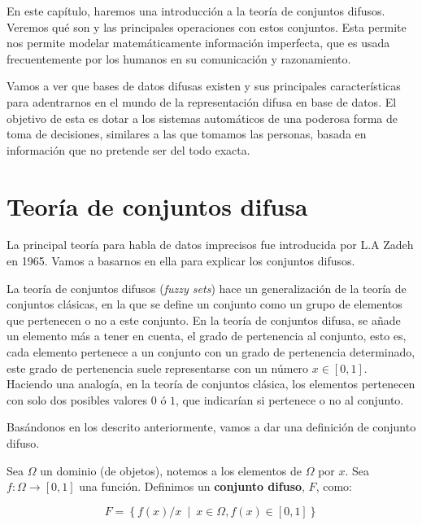 En este capítulo, haremos una introducción a la teoría de conjuntos difusos. Veremos qué son y las principales operaciones con estos conjuntos. Esta permite nos permite modelar matemáticamente información imperfecta, que es usada frecuentemente por los humanos en su comunicación y razonamiento.

Vamos a ver que bases de datos difusas existen y sus principales características para adentrarnos en el mundo de la representación difusa en base de datos. El objetivo de esta es dotar a los sistemas automáticos de una poderosa forma de toma de decisiones, similares a las que tomamos las personas, basada en información que no pretende ser del todo exacta.

\section{Teoría de conjuntos difusa}

La principal teoría para habla de datos imprecisos fue introducida por L.A Zadeh \cite{fuzzysetszadeh} en 1965. Vamos a basarnos en ella para explicar los conjuntos difusos.

La teoría de conjuntos difusos (\textit{fuzzy sets}) hace un generalización de la teoría de conjuntos clásicas, en la que se define un conjunto como un grupo de elementos que pertenecen o no a este conjunto. En la teoría de conjuntos difusa, se añade un elemento más a tener en cuenta, el grado de pertenencia al conjunto, esto es, cada elemento pertenece a un conjunto con un grado de pertenencia determinado, este grado de pertenencia suele representarse con un número $x \in [0,1]$. Haciendo una analogía, en la teoría de conjuntos clásica, los elementos pertenecen con solo dos posibles valores $0$ ó $1$, que indicarían si pertenece o no al conjunto.

Basándonos en los descrito anteriormente, vamos a dar una definición de conjunto difuso.

\begin{definition}
Sea $\Omega$ un dominio (de objetos), notemos a los elementos de $\Omega$ por $x$. Sea $f: \Omega \longrightarrow [0,1]$ una función. Definimos un \textbf{conjunto difuso}, $F$, como:

\begin{equation*}
    F = \left\{ f(x)/x \enspace | \enspace x\in\Omega, f(x) \in [0,1] \right\}
\end{equation*}
\end{definition}

